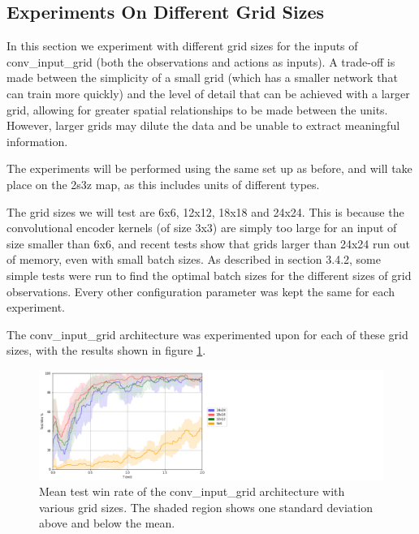 \subsection{Experiments On Different Grid Sizes}
In this section we experiment with different grid sizes for the inputs of conv\_input\_grid (both the observations and actions as inputs). A trade-off is made between the simplicity of a small grid (which has a smaller network that can train more quickly) and the level of detail that can be achieved with a larger grid, allowing for greater spatial relationships to be made between the units. However, larger grids may dilute the data and be unable to extract meaningful information.

The experiments will be performed using the same set up as before, and will take place on the 2s3z map, as this includes units of different types.



The grid sizes we will test are 6x6, 12x12, 18x18 and 24x24. This is because the convolutional encoder kernels (of size 3x3) are simply too large for an input of size smaller than 6x6, and recent tests show that grids larger than 24x24 run out of memory, even with small batch sizes. As described in section 3.4.2, some simple tests were run to find the optimal batch sizes for the different sizes of grid observations. Every other configuration parameter was kept the same for each experiment.





The conv\_input\_grid architecture was experimented upon for each of these grid sizes, with the results shown in figure \ref{fig:gridsizes}.


\begin{figure}
    \centering
    \hbox{\hspace{5em}\includegraphics[scale=0.5]{images/graphs/grids.png}}
    \caption{Mean test win rate of the conv\_input\_grid architecture with various grid sizes. The shaded region shows one standard deviation above and below the mean.}
    \label{fig:gridsizes}
\end{figure}

